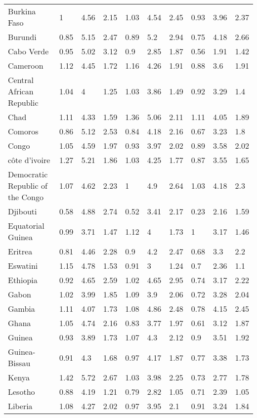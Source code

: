 \begin{longtable}[t]{llllllllll}
Burkina Faso & 1 & 4.56 & 2.15 & 1.03 & 4.54 & 2.45 & 0.93 & 3.96 & 2.37\\
Burundi & 0.85 & 5.15 & 2.47 & 0.89 & 5.2 & 2.94 & 0.75 & 4.18 & 2.66\\
Cabo Verde & 0.95 & 5.02 & 3.12 & 0.9 & 2.85 & 1.87 & 0.56 & 1.91 & 1.42\\
\addlinespace
Cameroon & 1.12 & 4.45 & 1.72 & 1.16 & 4.26 & 1.91 & 0.88 & 3.6 & 1.91\\
Central African Republic & 1.04 & 4 & 1.25 & 1.03 & 3.86 & 1.49 & 0.92 & 3.29 & 1.4\\
Chad & 1.11 & 4.33 & 1.59 & 1.36 & 5.06 & 2.11 & 1.11 & 4.05 & 1.89\\
Comoros & 0.86 & 5.12 & 2.53 & 0.84 & 4.18 & 2.16 & 0.67 & 3.23 & 1.8\\
Congo & 1.05 & 4.59 & 1.97 & 0.93 & 3.97 & 2.02 & 0.89 & 3.58 & 2.02\\
\addlinespace
côte d'ivoire & 1.27 & 5.21 & 1.86 & 1.03 & 4.25 & 1.77 & 0.87 & 3.55 & 1.65\\
Democratic Republic of the Congo & 1.07 & 4.62 & 2.23 & 1 & 4.9 & 2.64 & 1.03 & 4.18 & 2.3\\
Djibouti & 0.58 & 4.88 & 2.74 & 0.52 & 3.41 & 2.17 & 0.23 & 2.16 & 1.59\\
Equatorial Guinea & 0.99 & 3.71 & 1.47 & 1.12 & 4 & 1.73 & 1 & 3.17 & 1.46\\
Eritrea & 0.81 & 4.46 & 2.28 & 0.9 & 4.2 & 2.47 & 0.68 & 3.3 & 2.2\\
\addlinespace
Eswatini & 1.15 & 4.78 & 1.53 & 0.91 & 3 & 1.24 & 0.7 & 2.36 & 1.1\\
Ethiopia & 0.92 & 4.65 & 2.59 & 1.02 & 4.65 & 2.95 & 0.74 & 3.17 & 2.22\\
Gabon & 1.02 & 3.99 & 1.85 & 1.09 & 3.9 & 2.06 & 0.72 & 3.28 & 2.04\\
Gambia & 1.11 & 4.07 & 1.73 & 1.08 & 4.86 & 2.48 & 0.78 & 4.15 & 2.45\\
Ghana & 1.05 & 4.74 & 2.16 & 0.83 & 3.77 & 1.97 & 0.61 & 3.12 & 1.87\\
\addlinespace
Guinea & 0.93 & 3.89 & 1.73 & 1.07 & 4.3 & 2.12 & 0.9 & 3.51 & 1.92\\
Guinea-Bissau & 0.91 & 4.3 & 1.68 & 0.97 & 4.17 & 1.87 & 0.77 & 3.38 & 1.73\\
Kenya & 1.42 & 5.72 & 2.67 & 1.03 & 3.98 & 2.25 & 0.73 & 2.77 & 1.78\\
Lesotho & 0.88 & 4.19 & 1.21 & 0.79 & 2.82 & 1.05 & 0.71 & 2.39 & 1.05\\
Liberia & 1.08 & 4.27 & 2.02 & 0.97 & 3.95 & 2.1 & 0.91 & 3.24 & 1.84\\

\end{longtable}
